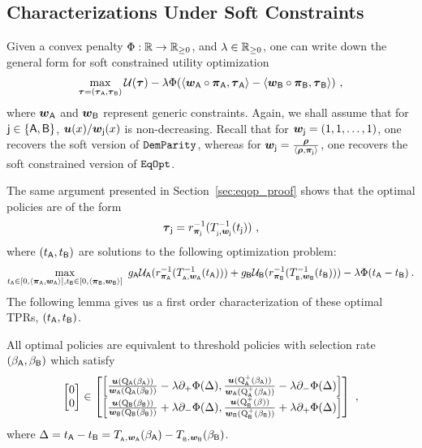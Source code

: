 \subsection{Characterizations Under Soft Constraints}
		
		Given a convex penalty $\Phi:\R \to \R_{\ge 0}$, and $\lambda \in \R_{\ge 0}$, one can write down the general form for soft constrained utility optimization
		\begin{eqnarray}\label{eq:soft_const}
		\max_{\pol = (\pola,\polb)}\Util(\pol) - \lambda \Phi(\langle \boldwa \circ \dista, \pola \rangle - \langle \boldwb \circ \distb, \polb \rangle)~,
		\end{eqnarray} 
		where $\boldwa$ and $\boldwb$ represent generic constraints. Again, we shall assume that for $\popj \in \pops$, $\util(x)/\boldwj(x)$ is non-decreasing.  Recall that for $\boldwj = (1,1,\dots,1)$, one recovers the soft version of $\dempar$, whereas for $\boldwj = \frac{\pb}{\langle \pb, \distj\rangle}$, one recovers the soft constrained version of $\eqop$. 

		The same argument presented in Section~\ref{sec:eqop_proof} shows that the optimal policies are of the form
		\begin{eqnarray*}
		\polj = \ratef_{\distj}^{-1}(\constfj^{-1}(t\supj))~,
		\end{eqnarray*}
		where $(t\supa,t\supb)$ are solutions to the following optimization problem:  
		\begin{eqnarray*}
		\max_{t\supa \in [0,\langle \dista, \boldwa \rangle],t\supb \in [0,\langle \distb, \boldwb \rangle]}~\fraca \Utila(\ratef_{\dista}^{-1}(\constfa^{-1}(t\supa))) + \fracb\Utilb(\ratef_{\distb}^{-1}(\constfb^{-1}(t\supb))) - \lambda \Phi(t\supa - t\supb)\:.
		\end{eqnarray*}
		The following lemma gives us a first order characterization of these optimal TPRs, $(t\supa, t\supb)$.
		\begin{lem}\label{lem:first_order_op} All optimal policies are equivalent to threshold policies with selection rate $(\accrate\supa,\accrate\supb)$ which satisfy
		\begin{eqnarray}
		\begin{bmatrix} 0 \\
		0 
		\end{bmatrix} \in
		\begin{bmatrix}
	\left[ \frac{\util(\RCDF\supa(\accratea))}{\boldwa(\RCDF\supa(\accrateb))}  - \lambda  \partial_+  \Phi(\Delta) ,\frac{\util(\RCDFpl\supa(\accratea))}{\boldwa(\RCDFpl\supa(\accratea))} - \lambda  \partial_-  \Phi(\Delta) \right] \\
	\left[ \frac{\util(\RCDF\supb(\accrateb))}{\boldwb(\RCDF\supb(\accrateb))}  + \lambda \partial_- \Phi(\Delta), \frac{\util(\RCDFpl\supb(\accrate))}{\boldwb(\RCDFpl\supb(\accrateb))} + \lambda \partial_+ \Phi(\Delta)  \right]
	\end{bmatrix}~,
		\end{eqnarray}
		where $\Delta = t\supa - t\supb = \constfa(\accratea) - \constfb(\accrateb)$.


		\end{lem}

